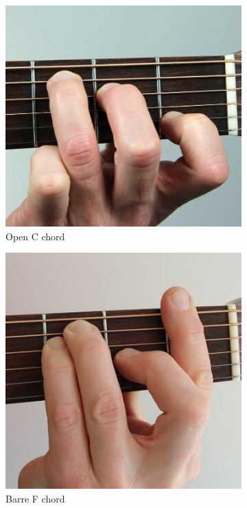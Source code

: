 \begin{figure}[h]
	\begin{subfigure}[b]{0.45\textwidth}
		\includegraphics[width=\textwidth]{../../Images/open-c-chord.jpg}
		\caption{Open C chord \cite{OpenCChordHand}}
		\label{fig:guitar-open-c-chord-hand-position}
	\end{subfigure}
	\hfill
	\begin{subfigure}[b]{0.45\textwidth}
		\includegraphics[width=\textwidth]{../../Images/F-major-barre-photo-768x768.jpg}
		\caption{Barre F chord \cite{BarreFChordHand}}
		\label{fig:guitar-barre-f-chord-hand-position}
	\end{subfigure}
	\caption{}
\end{figure}


